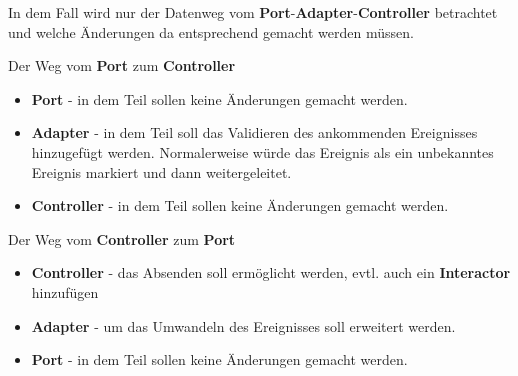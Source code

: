 In dem Fall wird nur der Datenweg vom \textbf{Port}-\textbf{Adapter}-\textbf{Controller} betrachtet und welche Änderungen
da entsprechend gemacht werden müssen.

Der Weg vom \textbf{Port} zum \textbf{Controller}

\begin{itemize}
    \item \textbf{Port} - in dem Teil sollen keine Änderungen gemacht werden.
    \item \textbf{Adapter} - in dem Teil soll das Validieren des ankommenden Ereignisses hinzugefügt werden. Normalerweise würde 
    das Ereignis als ein unbekanntes Ereignis markiert und dann weitergeleitet.
    \item \textbf{Controller} - in dem Teil sollen keine Änderungen gemacht werden.
\end{itemize}

Der Weg vom \textbf{Controller} zum \textbf{Port}
\begin{itemize}
    \item \textbf{Controller} - das Absenden soll ermöglicht werden, evtl. auch ein \textbf{Interactor} hinzufügen
    \item \textbf{Adapter} - um das Umwandeln des Ereignisses soll erweitert werden.
    \item \textbf{Port} - in dem Teil sollen keine Änderungen gemacht werden.
\end{itemize}
